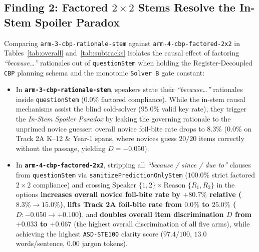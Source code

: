 \documentclass[11pt,a4paper]{article}
\begin{document}
\subsection{Finding 2: Factored $2\times 2$ Stems Resolve the In-Stem Spoiler Paradox}
Comparing \texttt{arm-3-cbp-rationale-stem} against \texttt{arm-4-cbp-factored-2x2} in Tables~\ref{tab:overall} and~\ref{tab:subtracks} isolates the causal effect of factoring \emph{``because\dots''} rationales out of \texttt{questionStem} when holding the Register-Decoupled \texttt{CBP} planning schema and the monotonic \texttt{Solver B} gate constant:
\begin{itemize}
  \item In \textbf{\texttt{arm-3-cbp-rationale-stem}}, speakers state their \emph{``because\dots''} rationales inside \texttt{questionStem} ($0.0\%$ factored compliance). While the in-stem causal mechanisms assist the blind cold-solver ($95.0\%$ valid key rate), they trigger the \emph{In-Stem Spoiler Paradox} by leaking the governing rationale to the unprimed novice guesser: overall novice foil-bite rate drops to \textbf{$8.3\%$} ($0.0\%$ on Track 2A K--12 \& Year-1 spans, where novices guess $20/20$ items correctly without the passage, yielding $D = -0.050$).
  \item In \textbf{\texttt{arm-4-cbp-factored-2x2}}, stripping all \emph{``because / since / due to''} clauses from \texttt{questionStem} via \texttt{sanitizePredictionOnlyStem} ($100.0\%$ strict factored $2\times 2$ compliance) and crossing $\text{Speaker } \{1,2\} \times \text{Reason } \{R_1,R_2\}$ in the options \textbf{increases overall novice foil-bite rate by $+80.7\%$ relative ($8.3\% \to 15.0\%$)}, \textbf{lifts Track 2A foil-bite rate from $0.0\%$ to $25.0\%$ ($D: -0.050 \to +0.100$)}, and \textbf{doubles overall item discrimination $D$ from $+0.033$ to $+0.067$} (the highest overall discrimination of all five arms), while achieving the highest \texttt{ASD-STE100} clarity score ($97.4/100$, $13.0$ words/sentence, $0.00$ jargon tokens).
\end{itemize}
\end{document}
